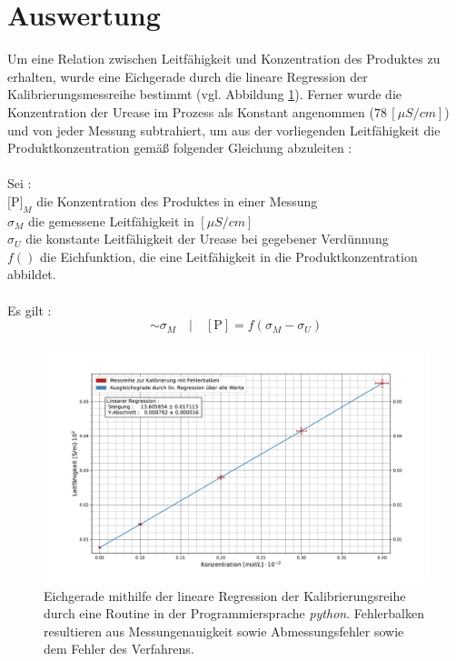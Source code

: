 %
%
\setlength\abovedisplayshortskip{20pt}
\setlength\belowdisplayshortskip{20pt}
\setlength\abovedisplayskip{20pt}
\setlength\belowdisplayskip{20pt}
\section {Auswertung}
Um eine Relation zwischen Leitfähigkeit und Konzentration des Produktes zu erhalten, wurde eine Eichgerade durch die lineare Regression der Kalibrierungsmessreihe bestimmt (vgl. Abbildung \ref{Eichgerade}). Ferner wurde die Konzentration der Urease im Prozess als Konstant angenommen ($ 78\,[\si{\mu S/cm}]$) und von jeder Messung subtrahiert, um aus der vorliegenden Leitfähigkeit die Produktkonzentration gemäß folgender Gleichung abzuleiten : \\
\\
Sei : \\
 $[$P$]_M$ die Konzentration des Produktes in einer Messung\\
 $\sigma_M$ die gemessene Leitfähigkeit in $[\si{\mu S/cm}]$\\
  $\sigma_U$ die konstante Leitfähigkeit der Urease bei gegebener Verdünnung \\
  $f()$ die Eichfunktion, die eine Leitfähigkeit in die Produktkonzentration abbildet.\\
  \\
  Es gilt :
\begin{equation}
[\text{P}]  \sim \sigma_M \quad| \quad [\text{P}]=f(\sigma_M-\sigma_U)
\label{Eichgleichung}
\end{equation}
\begin{figure}[H]
	\centering	
	\begin{minipage}{1\textwidth}
		\includegraphics[width=\columnwidth]{Bilder/Kalibierung.pdf}
	\end{minipage}
	\caption{Eichgerade mithilfe der lineare Regression der Kalibrierungsreihe durch eine Routine in der Programmiersprache \textit{python}. Fehlerbalken resultieren aus Messungenauigkeit sowie Abmessungsfehler sowie dem Fehler des Verfahrens.}
	\label{Eichgerade}
\end{figure}
